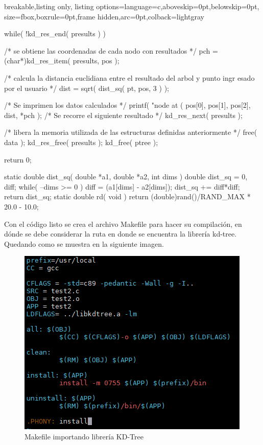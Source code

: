 \documentclass[12pt]{article}
\begin{document}
\begin{tcblisting}{breakable,listing only,
  listing options={language=c,aboveskip=0pt,belowskip=0pt},
  size=fbox,boxrule=0pt,frame hidden,arc=0pt,colback=lightgray}
{  while( !kd_res_end( presults ) ) {
    /* se obtiene las coordenadas de cada nodo con resultados */
    pch = (char*)kd_res_item( presults, pos );

    /* calcula la distancia euclidiana entre el resultado del arbol y punto ingr                                                                                                                            esado por el usuario */
    dist = sqrt( dist_sq( pt, pos, 3 ) );

    /* Se imprimen los datos calculados */
    printf( "node at (%
            pos[0], pos[1], pos[2], dist, *pch );
    /* Se recorre el siguiente resultado */
    kd_res_next( presults );
  }
  /* libera la memoria utilizada de las estructuras definidas anteriormente */
  free( data );
  kd_res_free( presults );
  kd_free( ptree );

  return 0;
}
static double dist_sq( double *a1, double *a2, int dims ) {
  double dist_sq = 0, diff;
  while( --dims >= 0 ) {
    diff = (a1[dims] - a2[dims]);
    dist_sq += diff*diff;
  }
  return dist_sq;
}
static double rd( void ) {
  return (double)rand()/RAND_MAX * 20.0 - 10.0;
}
\end{tcblisting}


Con el código listo se crea el archivo Makefile para hacer su compilación, en dónde se debe considerar la ruta en donde se encuentra la librería kd-tree. Quedando como se muestra en la siguiente imagen.

\begin{figure}[!h]
   \centering
   \includegraphics[scale=.72]{imgs/makefile_kdtree.png}
   \caption{Makefile importando librería KD-Tree}
   \label{fig1}
\end{figure}
\end{document}
